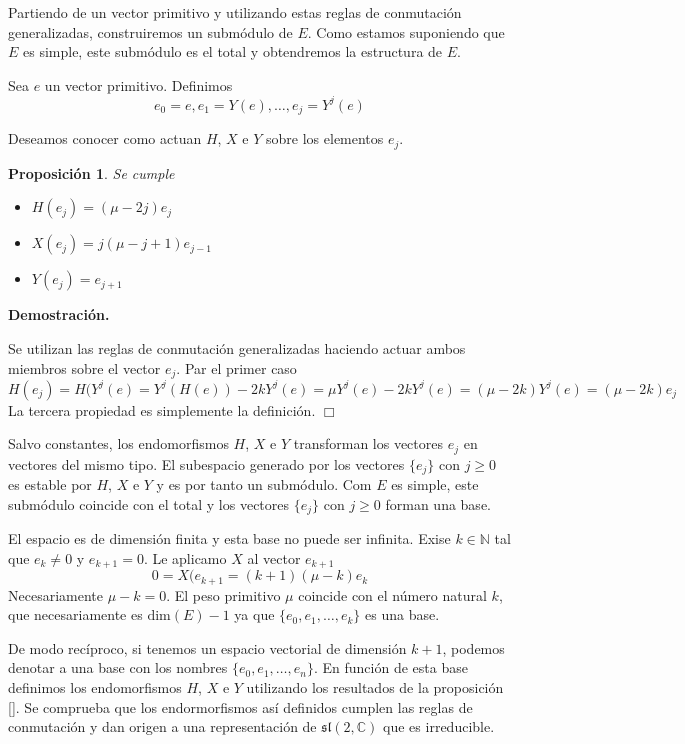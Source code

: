 \documentclass[a4paper,draft,12pt]{article}
\newtheorem{propo}[teo]{Proposición}%
\newcommand{\dem}{\noindent \textbf{Demostración. }\vspace{0.3 cm}}%
\newcommand{\C}{\mathbb{C}}%
\newcommand{\N}{\mathbb{N}}%
\newcommand{\fin}{ $\Box $ \vspace{0.4 cm}}
\begin{document}
Partiendo de un vector primitivo y utilizando estas reglas de conmutación generalizadas, construiremos un submódulo de $E$.  Como estamos suponiendo que $E$ es simple, este submódulo es el total y obtendremos la estructura de $E$.

Sea $e$ un vector primitivo. Definimos
$$
e_0=e, e_1=Y(e), \dots, e_j=Y^j(e)
$$

Deseamos conocer como actuan $H$, $X$ e $Y$ sobre los elementos $e_j$.

\begin{propo}

Se cumple

\begin{itemize}

\item $H(e_j)= (\mu-2j)e_j$

\item $X(e_j)= j(\mu-j+1)e_{j-1}$

\item $Y(e_j)= e_{j+1}$


\end{itemize}

\end{propo}

\dem

Se utilizan las reglas de conmutación generalizadas haciendo actuar ambos miembros sobre el vector $e_j$.  Par el primer caso
$$
H(e_j)= H(Y^j(e)= Y^j(H(e))-2kY^j(e)= \mu Y^j(e)-2kY^j(e)= (\mu-2k)Y^j(e)=(\mu-2k)e_j
$$
La tercera propiedad es simplemente la definición. \fin

Salvo constantes, los endomorfismos $H$, $X$ e $Y$ transforman los vectores $e_j$ en vectores del mismo tipo.  El subespacio generado por los vectores $\{e_j\}$ con $j \geq 0$ es estable por $H$, $X$ e $Y$ y es por tanto un submódulo.  Com $E$ es simple, este submódulo coincide con el total y los vectores $\{e_j\}$ con $j\geq 0$ forman una base.

El espacio es de dimensión finita y esta base no puede ser infinita.  Exise $k \in \N$ tal que $e_k\neq 0$ y $e_{k+1}=0$.  Le aplicamo $X$ al vector $e_{k+1}$
$$
0=X(e_{k+1}= (k+1)(\mu-k)e_k
$$
Necesariamente $\mu -k=0$.  El peso primitivo $\mu$ coincide con el número natural $k$, que necesariamente es $\mathrm{dim}(E)-1$ ya que $\{e_0,e_1,\dots, e_k\}$ es una base.

De modo recíproco, si tenemos un espacio vectorial de dimensión $k+1$, podemos denotar a una base con los nombres $\{e_0,e_1,\dots, e_n\}$.  En función de esta base definimos los endomorfismos $H$, $X$ e $Y$ utilizando los resultados de la proposición \ref{}.  Se comprueba que los endormorfismos así definidos cumplen las reglas de conmutación y dan origen a una representación de $\mathfrak{sl}(2,\C)$ que es irreducible.
\end{document}
